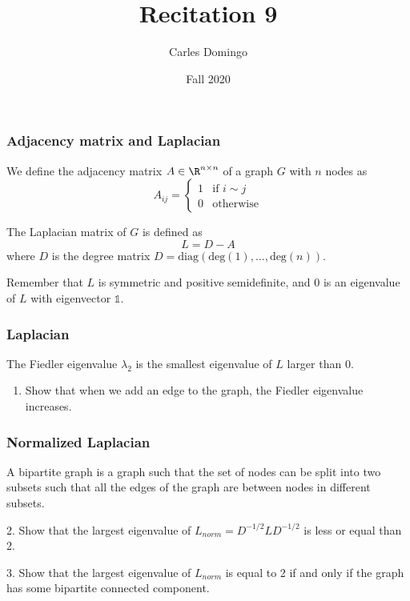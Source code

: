 \documentclass{beamer}
\title{Recitation 9}
\author{Carles Domingo}
\date{Fall 2020}
\begin{document}
\frame{\titlepage} 

\setcounter{showProgressBar}{0}
\setcounter{showSlideNumbers}{1}

\begin{frame}[t]
\frametitle{Adjacency matrix and Laplacian}
\begin{definition}
We define the adjacency matrix $A \in \R^{n \times n}$ of a graph $G$ with $n$ nodes as
\begin{equation*} 
A_{ij} = \begin{cases}
1 &\text{if } i \sim j \\
0 &\text{otherwise}
\end{cases}
\end{equation*}
\end{definition}

\begin{definition}
The Laplacian matrix of $G$ is defined as
\begin{equation*} 
L = D - A
\end{equation*}
where $D$ is the degree matrix $D = \text{diag}(\text{deg}(1), \dots, \text{deg}(n))$.
\end{definition}
Remember that $L$ is symmetric and positive semidefinite, and 0 is an eigenvalue of $L$ with eigenvector $\mathds{1}$.
\end{frame}

\begin{frame}[t]
\frametitle{Laplacian}
The Fiedler eigenvalue $\lambda_2$ is the smallest eigenvalue of $L$ larger than 0.
\begin{enumerate}
\item Show that when we add an edge to the graph, the Fiedler eigenvalue increases.
\end{enumerate}
\pause
\end{frame}

\begin{frame}[t]
\frametitle{Normalized Laplacian}
\vspace{-10pt}
A bipartite graph is a graph such that the set of nodes can be split into two subsets such that all the edges of the graph are between nodes in different subsets.

2. Show that the largest eigenvalue of $L_{norm} = D^{-1/2} L D^{-1/2}$ is less or equal than 2.

3. Show that the largest eigenvalue of $L_{norm}$ is equal to 2 if and only if the graph has some bipartite connected component.
\end{frame}
\end{document}
